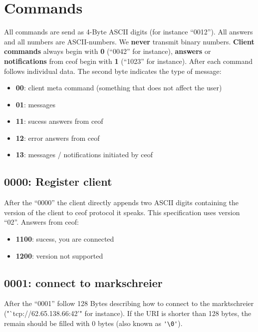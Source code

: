 \documentclass[12pt,a4paper]{article}
\begin{document}
\section{Commands}
All commands are send as 4-Byte ASCII digits (for instance "`0012"').
All answers and all numbers are ASCII-numbers. We
\textbf{never} transmit binary numbers.
\textbf{Client commands} always begin with \textbf{0} ("`0042"' for instance),
\textbf{answers} or \textbf{notifications} from
ceof begin with \textbf{1} ("`1023"' for instance).
After each command follows individual data. The second byte indicates the type of message:
\begin{itemize}
\item \textbf{00}: client meta command (something that does not affect the user)
\item \textbf{01}: messages
\item \textbf{11}: sucess answers from ceof
\item \textbf{12}: error answers from ceof
\item \textbf{13}: messages / notifications initiated by ceof
\end{itemize}

\subsection{0000: Register client}
After the "`0000"' the client directly appends two ASCII digits containing the
version of the client to ceof protocol it speaks. This specification
uses version "`02"'.
Answers from ceof:
\begin{itemize}
\item \textbf{1100}: sucess, you are connected
\item \textbf{1200}: version not supported
\end{itemize}

\subsection{0001: connect to markschreier}
After the "`0001"' follow 128 Bytes describing how to connect
to the marktschreier ("`tcp://62.65.138.66:42'" for instance).
If the URI is shorter than 128 bytes, the remain should be filled with 0 bytes
(also known as \verb='\0'=).
\end{document}
